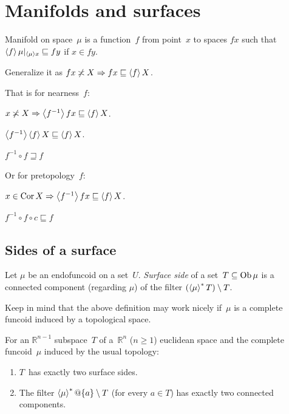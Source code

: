 \chapter{Manifolds and surfaces}

Manifold on space~$\mu$ is a function~$f$ from point~$x$ to spaces $fx$ such that
$\left\langle f\right\rangle\mu|_{\left\langle \mu\right\rangle x} \sqsubseteq fy$ if $x\in fy$.

Generalize it as
$fx\not\asymp X \Rightarrow fx \sqsubseteq \left\langle f\right\rangle X$.

That is for nearness~$f$:

$x\not\asymp X \Rightarrow \left\langle f^{-1}\right\rangle fx \sqsubseteq \left\langle f\right\rangle X$.

$\left\langle f^{-1}\right\rangle\left\langle f\right\rangle X \sqsubseteq \left\langle f\right\rangle X$.

$f^{-1}\circ f \sqsupseteq f$

Or for pretopology~$f$:

$x\in\operatorname{Cor} X \Rightarrow \left\langle f^{-1}\right\rangle fx \sqsubseteq \left\langle f\right\rangle X$.

$f^{-1}\circ f\circ c\sqsubseteq f$

\section{Sides of a surface}

\begin{defn}
Let $\mu$ be an endofuncoid on a set~$U$.
\emph{Surface side} of a set~$T\subseteq\operatorname{Ob}\mu$ is a connected component
(regarding $\mu$) of the filter $(\left\langle \mu\right\rangle ^{\ast}T)\setminus T$.
\end{defn}

Keep in mind that the above definition may work nicely if~$\mu$ is
a complete funcoid induced by a topological space.

\begin{example}
For an $\mathbb{R}^{n-1}$ subspace~$T$ of a~$\mathbb{R}^n$ ($n\geq 1$)
euclidean space and the complete funcoid~$\mu$ induced by the usual topology:
\begin{enumerate}
\item $T$~has exactly two surface sides.
\item The filter $\left\langle \mu\right\rangle ^{\ast}@\{a\} \setminus T$ (for every $a\in T$)
  has exactly two connected components.
\end{enumerate}
\end{example}

